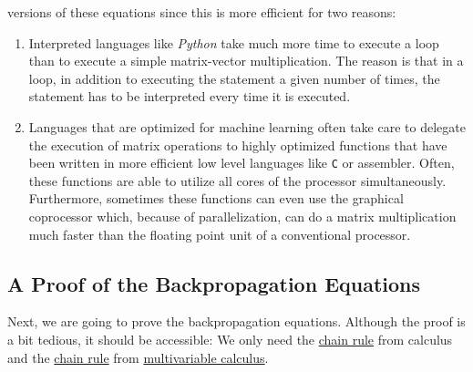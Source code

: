 versions of these equations since this is more efficient for two reasons:
\begin{enumerate}
\item Interpreted languages like \textsl{Python} take much more time to
      execute a loop than to execute a simple matrix-vector multiplication.  The reason is that in a loop, in
      addition to executing the statement a given number of times, the statement has to be interpreted 
      every time it is executed.
\item Languages that are optimized for machine learning often take care to delegate the execution of matrix
      operations to highly optimized functions that have been written in more efficient low level languages like
      \texttt{C} or assembler.  Often, these functions are able to utilize all cores of the processor
      simultaneously.  Furthermore, sometimes these functions can even use the graphical coprocessor
      which, because of parallelization, can do a matrix multiplication much faster than the floating point unit of
      a conventional processor.
\end{enumerate}

\subsection{A Proof of the Backpropagation Equations}
Next, we are going to prove the backpropagation equations.  Although the proof is a bit tedious, it should be
accessible: We only need the \href{https://en.wikipedia.org/wiki/Chain_rule}{chain rule} from calculus and the 
\href{https://en.wikipedia.org/wiki/Chain_rule#Multivariable_case}{chain rule} from
\href{https://en.wikipedia.org/wiki/Multivariable_calculus}{multivariable calculus}. 

